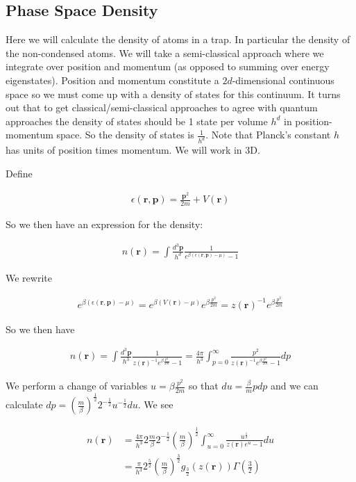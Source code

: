 \documentclass[12pt]{article}
\newcommand{\ep}{\epsilon}
\newcommand{\bv}[1]{\boldsymbol{#1}}
\begin{document}
\subsection{Phase Space Density}

Here we will calculate the density of atoms in a trap. In particular the density of the non-condensed atoms. We will take a semi-classical approach where we integrate over position and momentum (as opposed to summing over energy eigenstates). Position and momentum constitute a $2d$-dimensional continuous space so we must come up with a density of states for this continuum. It turns out that to get classical/semi-classical approaches to agree with quantum approaches the density of states should be 1 state per volume $h^d$ in position-momentum space. So the density of states is $\frac{1}{h^d}$. Note that Planck's constant $h$ has units of position times momentum. We will work in 3D.

Define

\begin{align}
\ep(\bv{r},\bv{p}) = \frac{\bv{p}^2}{2m} + V(\bv{r})
\end{align}

So we then have an expression for the density:

\begin{align}
n(\bv{r}) =  \int \frac{d^3\bv{p}}{h^d} \frac{1}{e^{\beta(\ep(\bv{r},\bv{p})-\mu)}-1}  
\end{align}

We rewrite

\begin{align}
e^{\beta(\ep(\bv{r},\bv{p})-\mu)} = e^{\beta(V(\bv{r}) - \mu)}e^{\beta \frac{p^2}{2m}} = z(\bv{r})^{-1}e^{\beta \frac{p^2}{2m}}
\end{align}

So we then have

\begin{align}
n(\bv{r}) =  \int \frac{d^3\bv{p}}{h^3} \frac{1}{z(\bv{r})^{-1} e^{\beta\frac{p^2}{2m}}-1}  = \frac{4\pi}{h^3} \int_{p=0}^{\infty} \frac{p^2}{z(\bv{r})^{-1}e^{\beta \frac{p^2}{2m}}-1} dp
\end{align}

We perform a change of variables $u = \beta \frac{p^2}{2m}$ so that $du = \frac{\beta}{m} p dp$ and we can calculate $dp = \left(\frac{m}{\beta}\right)^{\frac{1}{2}}2^{-\frac{1}{2}} u^{-\frac{1}{2}} du$. We see

\begin{align}
n(\bv{r}) &= \frac{4\pi}{h^3} 2\frac{m}{\beta} 2^{-\frac{1}{2}} \left(\frac{m}{\beta} \right)^{\frac{1}{2}} \int_{u=0}^{\infty} \frac{u^{\frac{1}{2}}}{z(\bv{r})e^u - 1} du\\
&= \frac{\pi}{h^3}2^{\frac{5}{2}}\left(\frac{m}{\beta}\right)^{\frac{3}{2}} g_{\frac{3}{2}}(z(\bv{r})) \Gamma\left(\frac{3}{2}\right)
\end{align}
\end{document}
